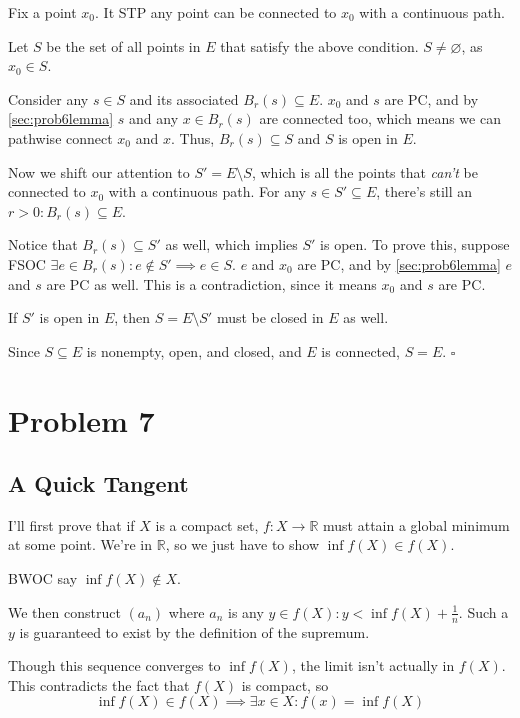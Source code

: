 \documentclass[12pt]{article}
\newcommand{\R}{\mathbb{R}}
\begin{document}
Fix a point $x_0$.
It STP any point can be connected to $x_0$ with a continuous path.

Let $S$ be the set of all points in $E$ that satisfy the above condition.
$S \ne \varnothing$, as $x_0 \in S$.

Consider any $s \in S$ and its associated $B_r(s) \subseteq E$.
$x_0$ and $s$ are PC, and by \ref{sec:prob6lemma}
$s$ and any $x \in B_r(s)$ are connected too,
which means we can pathwise connect $x_0$ and $x$.
Thus, $B_r(s) \subseteq S$ and $S$ is open in $E$.

Now we shift our attention to $S' = E \setminus S$, which is
all the points that \textit{can't} be connected to $x_0$ with a continuous path.
For any $s \in S' \subseteq E$, there's still an $r > 0: B_r(s) \subseteq E$.

Notice that $B_r(s) \subseteq S'$ as well, which implies $S'$ is open.
To prove this, suppose FSOC $\exists e \in B_r(s): e \notin S' \implies e \in S$.
$e$ and $x_0$ are PC, and by \ref{sec:prob6lemma}
$e$ and $s$ are PC as well.
This is a contradiction, since it means $x_0$ and $s$ are PC.

If $S'$ is open in $E$, then $S=E \setminus S'$ must be closed in $E$ as well.

Since $S \subseteq E$ is nonempty, open, and closed, and $E$ is connected, $S=E$. $\square$

\pagebreak

\section{Problem 7}

\subsection{A Quick Tangent}

I'll first prove that if $X$ is a compact set, $f: X \to \R$
must attain a global minimum at some point.
We're in $\R$, so we just have to show $\inf f(X) \in f(X)$.

BWOC say $\inf f(X) \notin X$.

We then construct $(a_n)$ where $a_n$ is any $y \in f(X): y < \inf f(X) + \frac{1}{n}$.
Such a $y$ is guaranteed to exist by the definition of the supremum.

Though this sequence converges to $\inf f(X)$, the limit isn't actually in $f(X)$.
This contradicts the fact that $f(X)$ is compact, so
\[\inf f(X) \in f(X) \implies \exists x \in X: f(x) = \inf f(X)\]
\end{document}
